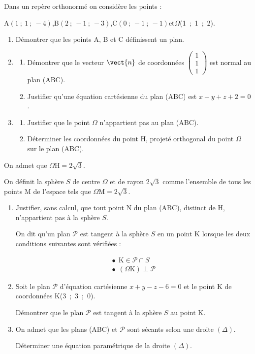 \medskip

Dans un repère orthonormé \Oijk{} on considère les points :
\begin{center} A$(1~;~1~;~-4)$,\quad B$(2~;~-1~;~-3)$,\quad  C$(0~;~-1~;~-1)$\quad  et\quad  $\Omega$(1~;~1~;~2).\end{center}

\smallskip

\begin{enumerate}
\item Démontrer que les points A, B et C définissent un plan.
\item 
	\begin{enumerate}
		\item Démontrer que le vecteur $\vect{n}$ de coordonnées $\begin{pmatrix}1\\1\\1\end{pmatrix}$ est normal au plan (ABC).
		\item Justifier qu'une équation cartésienne du plan (ABC) est $x + y + z + 2 = 0$.
	\end{enumerate}
\item 
	\begin{enumerate}
		\item Justifier que le point $\Omega$ n'appartient pas au plan (ABC).
		\item Déterminer les coordonnées du point H, projeté orthogonal du point $\Omega$ sur le plan (ABC).
	\end{enumerate}
			\end{enumerate}

On admet que $\Omega \text{H} = 2\sqrt 3$.

On définit la sphère $S$ de centre $\Omega$ et de rayon $2\sqrt 3$ comme l'ensemble de tous les points M de l'espace tels que $\Omega\text{M} = 2\sqrt 3$.

	\begin{enumerate}[resume]

\item Justifier, sans calcul, que tout point N du plan (ABC), distinct de H, n'appartient pas à la sphère $S$.

On dit qu'un plan $\mathcal{P}$ est tangent à la sphère $S$ en un point K lorsque les deux conditions suivantes sont vérifiées :

\[\begin{array}{l}
\bullet~~ \text{K} \in \mathcal{P} \cap S\\
\bullet~~ (\Omega\text{K}) \perp \mathcal{P}
\end{array}
\]
\item Soit le plan $\mathcal{P}$ d'équation cartésienne $x +y - z - 6 = 0$ et le point K de coordonnées K(3~;~3~;~0).

Démontrer que le plan $\mathcal{P}$ est tangent à la sphère $S$ au point K.
\item On admet que les plans (ABC) et $\mathcal{P}$ sont sécants selon une droite $(\Delta)$.

Déterminer une équation paramétrique de la droite $(\Delta)$.
\end{enumerate}

\bigskip
